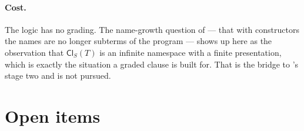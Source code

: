 \documentclass[11pt]{article}
\theoremstyle{plain}
\theoremstyle{definition}
\theoremstyle{remark}
\newcommand{\Cl}{\mathsf{Cl}}
\begin{document}
\paragraph{Cost.} The logic has no grading. The name-growth question of
\cite[\S12]{rhocomb3} --- that with constructors the names are no longer
subterms of the program --- shows up here as the observation that $\Cl_{S}(T)$
is an infinite namespace with a finite presentation, which is exactly the
situation a graded clause is built for. That is the bridge to
\cite{softwhere}'s stage two and is not pursued.

\section{Open items}
\label{sec:open}
\end{document}
